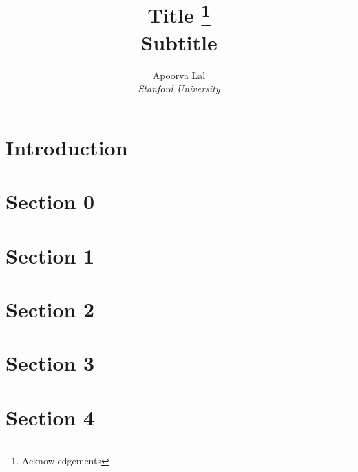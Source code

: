 \documentclass[a4paper, 12pt]{article}
\title{Title \thanks{Acknowledgements} \\
  \large Subtitle}
\author{
  Apoorva Lal \\
  \emph{Stanford University}
}
\begin{document}
\begin{titlingpage}
    \maketitle
    \begin{abstract}
        \lipsum[4]
    \end{abstract}
\end{titlingpage}


\section*{Introduction}


\cite{Deatonanalysishouseholdsurveys1997}

\parencite{Acemoglucolonialoriginscomparative2001}


\section{Section 0}
\lipsum[2]

\section{Section 1}
\lipsum[3]

\section{Section 2}
\lipsum[3]

\section{Section 3}
\lipsum[4]

\section{Section 4}
\lipsum[7]

\printbibliography
\end{document}
